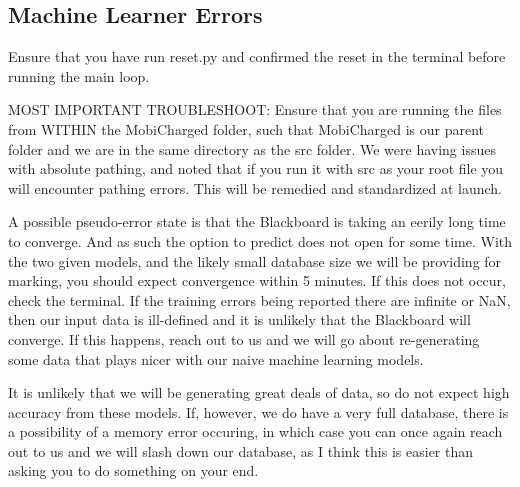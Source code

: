 \documentclass[12pt, titlepage]{article}
\begin{document}
\subsection{Machine Learner Errors}

Ensure that you have run reset.py and confirmed the reset in the terminal before running the main loop.

MOST IMPORTANT TROUBLESHOOT: Ensure that you are running the files from WITHIN the MobiCharged folder, such that MobiCharged is our parent folder and we are in the same directory as the src folder. We were having issues with absolute pathing, and noted that if you run it with src as your root file you will encounter pathing errors. This will be remedied and standardized at launch.

A possible pseudo-error state is that the Blackboard is taking an eerily long time to converge. And as such the option to predict does not open for some time. With the two given models, and the likely small database size we will be providing for marking, you should expect convergence within 5 minutes. If this does not occur, check the terminal. If the training errors being reported there are infinite or NaN, then our input data is ill-defined and it is unlikely that the Blackboard will converge. If this happens, reach out to us and we will go about re-generating some data that plays nicer with our naive machine learning models.

It is unlikely that we will be generating great deals of data, so do not expect high accuracy from these models. If, however, we do have a very full database, there is a possibility of a memory error occuring, in which case you can once again reach out to us and we will slash down our database, as I think this is easier than asking you to do something on your end.
\end{document}
